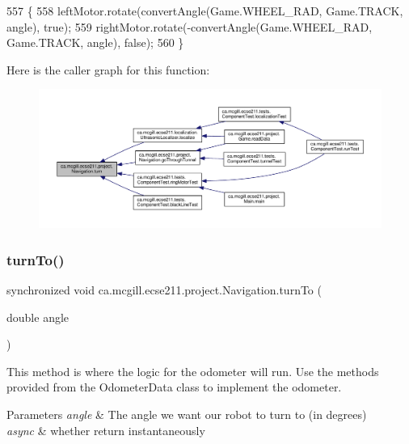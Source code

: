 \begin{DoxyCode}
557                               \{
558     leftMotor.rotate(convertAngle(Game.WHEEL\_RAD, Game.TRACK, angle), \textcolor{keyword}{true});
559     rightMotor.rotate(-convertAngle(Game.WHEEL\_RAD, Game.TRACK, angle), \textcolor{keyword}{false});
560   \}
\end{DoxyCode}
Here is the caller graph for this function\+:
\nopagebreak
\begin{figure}[H]
\begin{center}
\leavevmode
\includegraphics[width=350pt]{classca_1_1mcgill_1_1ecse211_1_1project_1_1_navigation_ad74286ad36d333bfaf57661837457b76_icgraph}
\end{center}
\end{figure}
\mbox{\label{classca_1_1mcgill_1_1ecse211_1_1project_1_1_navigation_a3bbe0645f2b3b3d0986b4a707fb5a00c}} 
\subsubsection{\texorpdfstring{turn\+To()}{turnTo()}}
{\footnotesize\ttfamily synchronized void ca.\+mcgill.\+ecse211.\+project.\+Navigation.\+turn\+To (\begin{DoxyParamCaption}\item[{double}]{angle }\end{DoxyParamCaption})}

This method is where the logic for the odometer will run. Use the methods provided from the Odometer\+Data class to implement the odometer.


\begin{DoxyParams}{Parameters}
{\em angle} & The angle we want our robot to turn to (in degrees) \\
\hline
{\em async} & whether return instantaneously \\
\hline
\end{DoxyParams}


